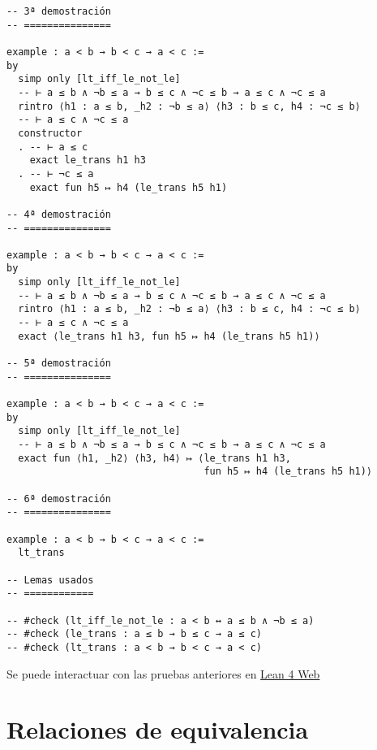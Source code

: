 \begin{verbatim}
-- 3ª demostración
-- ===============

example : a < b → b < c → a < c :=
by
  simp only [lt_iff_le_not_le]
  -- ⊢ a ≤ b ∧ ¬b ≤ a → b ≤ c ∧ ¬c ≤ b → a ≤ c ∧ ¬c ≤ a
  rintro ⟨h1 : a ≤ b, _h2 : ¬b ≤ a⟩ ⟨h3 : b ≤ c, h4 : ¬c ≤ b⟩
  -- ⊢ a ≤ c ∧ ¬c ≤ a
  constructor
  . -- ⊢ a ≤ c
    exact le_trans h1 h3
  . -- ⊢ ¬c ≤ a
    exact fun h5 ↦ h4 (le_trans h5 h1)

-- 4ª demostración
-- ===============

example : a < b → b < c → a < c :=
by
  simp only [lt_iff_le_not_le]
  -- ⊢ a ≤ b ∧ ¬b ≤ a → b ≤ c ∧ ¬c ≤ b → a ≤ c ∧ ¬c ≤ a
  rintro ⟨h1 : a ≤ b, _h2 : ¬b ≤ a⟩ ⟨h3 : b ≤ c, h4 : ¬c ≤ b⟩
  -- ⊢ a ≤ c ∧ ¬c ≤ a
  exact ⟨le_trans h1 h3, fun h5 ↦ h4 (le_trans h5 h1)⟩

-- 5ª demostración
-- ===============

example : a < b → b < c → a < c :=
by
  simp only [lt_iff_le_not_le]
  -- ⊢ a ≤ b ∧ ¬b ≤ a → b ≤ c ∧ ¬c ≤ b → a ≤ c ∧ ¬c ≤ a
  exact fun ⟨h1, _h2⟩ ⟨h3, h4⟩ ↦ ⟨le_trans h1 h3,
                                  fun h5 ↦ h4 (le_trans h5 h1)⟩

-- 6ª demostración
-- ===============

example : a < b → b < c → a < c :=
  lt_trans

-- Lemas usados
-- ============

-- #check (lt_iff_le_not_le : a < b ↔ a ≤ b ∧ ¬b ≤ a)
-- #check (le_trans : a ≤ b → b ≤ c → a ≤ c)
-- #check (lt_trans : a < b → b < c → a < c)
\end{verbatim}
Se puede interactuar con las pruebas anteriores en \href{https://lean.math.hhu.de/\#url=https://raw.githubusercontent.com/jaalonso/Calculemus2/main/src/Preorden\_transitiva.lean}{Lean 4 Web}

\chapter{Relaciones de equivalencia}
\label{sec:org53d5e30}

